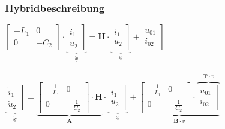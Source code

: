 \documentclass[a4paper,twocolumn,10pt]{article}
\begin{document}
\subsubsection*{Hybridbeschreibung}
$\begin{bmatrix}-L_1 & 0 \\ 0 & -C_2\end{bmatrix}\cdot \underbrace{\left.\begin{matrix}\dot i_1 \\ \dot u_2\end{matrix}\right]}_{\underline{\dot x}}=\textbf{H}\cdot \underbrace{\left.\begin{matrix}i_1 \\ u_2\end{matrix}\right]}_{\underline{x}}+\left.\begin{matrix}u_{01} \\ i_{02}\end{matrix}\right]$\\\\
$\underbrace{\left.\begin{matrix}\dot i_1 \\ \dot u_2\end{matrix}\right]}_{\underline{\dot x}}=\underbrace{\begin{bmatrix}-\frac{1}{L_1} & 0 \\ 0 & -\frac{1}{C_2}\end{bmatrix}\cdot\textbf{H}}_{\textbf{A}}\cdot \underbrace{\left.\begin{matrix}i_1 \\ u_2\end{matrix}\right]}_{\underline{x}}+\underbrace{\begin{bmatrix}-\frac{1}{L_1} & 0 \\ 0 & -\frac{1}{C_2}\end{bmatrix}\cdot\overbrace{\left.\begin{matrix}u_{01} \\ i_{02}\end{matrix}\right]}^{\textbf{T}\cdot \underline{v}}}_{\textbf{B}\cdot \underline{v}}$
\end{document}
